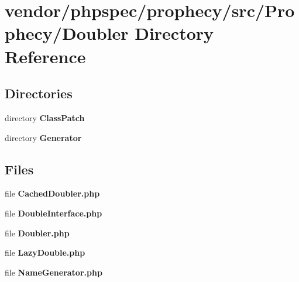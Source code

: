 \section{vendor/phpspec/prophecy/src/\+Prophecy/\+Doubler Directory Reference}
\label{dir_afd91322367ff7c59e6ac485b035e084}
\subsection*{Directories}
\begin{DoxyCompactItemize}
\item 
directory {\bf Class\+Patch}
\item 
directory {\bf Generator}
\end{DoxyCompactItemize}
\subsection*{Files}
\begin{DoxyCompactItemize}
\item 
file {\bf Cached\+Doubler.\+php}
\item 
file {\bf Double\+Interface.\+php}
\item 
file {\bf Doubler.\+php}
\item 
file {\bf Lazy\+Double.\+php}
\item 
file {\bf Name\+Generator.\+php}
\end{DoxyCompactItemize}
